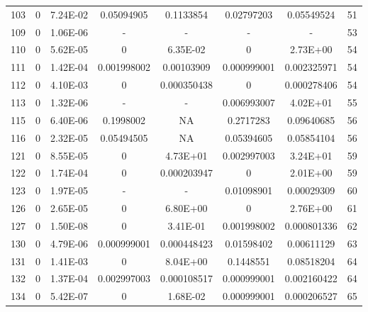 {\begin{longtable}{cccccccc}
103 & {\color{red}0} & 7.24E-02 & 0.05094905 & 0.1133854 & {\color{red}0.02797203} & 0.05549524 & 51 \\
109 & {\color{red}0} & {\color{red}1.06E-06} & - & - & - & - & 53 \\
110 & {\color{red}0} & {\color{red}5.62E-05} & {\color{red}0} & 6.35E-02 & {\color{red}0} & 2.73E+00 & 54 \\
111 & {\color{red}0} & {\color{red}1.42E-04} & {\color{red}0.001998002} & {\color{red}0.00103909} & {\color{red}0.000999001} & {\color{red}0.002325971} & 54 \\
112 & {\color{red}0} & {\color{red}4.10E-03} & {\color{red}0} & {\color{red}0.000350438} & {\color{red}0} & {\color{red}0.000278406} & 54 \\
113 & {\color{red}0} & {\color{red}1.32E-06} & - & - & {\color{red}0.006993007} & 4.02E+01 & 55 \\
115 & {\color{red}0} & {\color{red}6.40E-06} & 0.1998002 & NA & 0.2717283 & 0.09640685 & 56 \\
116 & {\color{red}0} & {\color{red}2.32E-05} & 0.05494505 & NA & 0.05394605 & 0.05854104 & 56 \\
121 & {\color{red}0} & {\color{red}8.55E-05} & {\color{red}0} & 4.73E+01 & {\color{red}0.002997003} & 3.24E+01 & 59 \\
122 & {\color{red}0} & {\color{red}1.74E-04} & {\color{red}0} & {\color{red}0.000203947} & {\color{red}0} & 2.01E+00 & 59 \\
123 & {\color{red}0} & {\color{red}1.97E-05} & - & - & {\color{red}0.01098901} & {\color{red}0.00029309} & 60 \\
126 & {\color{red}0} & {\color{red}2.65E-05} & {\color{red}0} & 6.80E+00 & {\color{red}0} & 2.76E+00 & 61 \\
127 & {\color{red}0} & {\color{red}1.50E-08} & {\color{red}0} & 3.41E-01 & {\color{red}0.001998002} & {\color{red}0.000801336} & 62 \\
130 & {\color{red}0} & {\color{red}4.79E-06} & {\color{red}0.000999001} & {\color{red}0.000448423} & {\color{red}0.01598402} & {\color{red}0.00611129} & 63 \\
131 & {\color{red}0} & {\color{red}1.41E-03} & {\color{red}0} & 8.04E+00 & 0.1448551 & 0.08518204 & 64 \\
132 & {\color{red}0} & {\color{red}1.37E-04} & {\color{red}0.002997003} & {\color{red}0.000108517} & {\color{red}0.000999001} & {\color{red}0.002160422} & 64 \\
134 & {\color{red}0} & {\color{red}5.42E-07} & {\color{red}0} & {\color{red}1.68E-02} & {\color{red}0.000999001} & {\color{red}0.000206527} & 65 \\

\end{longtable}}
